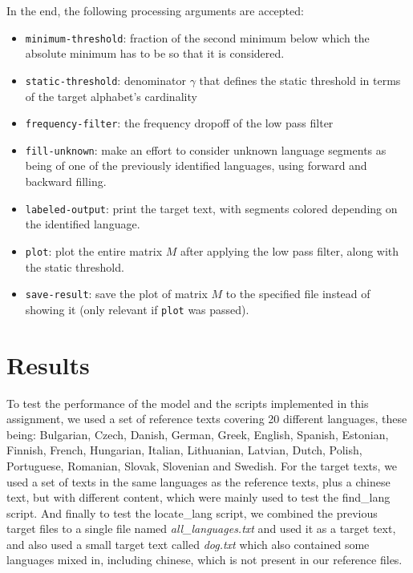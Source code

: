 \documentclass{article}
\begin{document}
In the end, the following processing arguments are accepted:
\begin{itemize}
    \item \verb|minimum-threshold|: fraction of the second minimum below which the absolute minimum has to be so that it is considered.
    \item \verb|static-threshold|: denominator $\gamma$ that defines the static threshold in terms of the target alphabet's cardinality
    \item \verb|frequency-filter|: the frequency dropoff of the low pass filter
    \item \verb|fill-unknown|: make an effort to consider unknown language segments as being of one of the previously identified languages, using forward and backward filling.
    \item \verb|labeled-output|: print the target text, with segments colored depending on the identified language.
    \item \verb|plot|: plot the entire matrix $M$ after applying the low pass filter, along with the static threshold.
    \item \verb|save-result|: save the plot of matrix $M$ to the specified file instead of showing it (only relevant if \verb|plot| was passed).
\end{itemize}

\section{Results}
\label{sec:results}


To test the performance of the model and the scripts implemented in this assignment, we used a set of reference texts covering 20 different languages,
these being: Bulgarian, Czech, Danish, German, Greek, English, Spanish, Estonian, Finnish, French, Hungarian, Italian, Lithuanian, Latvian, Dutch, Polish, Portuguese, Romanian, Slovak, Slovenian and Swedish.
For the target texts, we used a set of texts in the same languages as the reference texts, plus a chinese text, but with different content, which were mainly used to test the find_lang script.
And finally to test the locate_lang script, we combined the previous target files to a single file named \textit{all_languages.txt} and used it as a target text, and also used a small target text called \textit{dog.txt}
which also contained some languages mixed in, including chinese, which is not present in our reference files.
\end{document}
